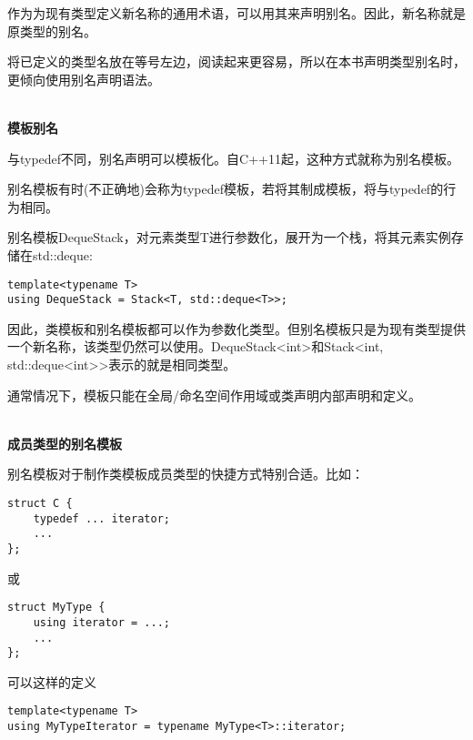 作为为现有类型定义新名称的通用术语，可以用其来声明别名。因此，新名称就是原类型的别名。

将已定义的类型名放在等号左边，阅读起来更容易，所以在本书声明类型别名时，更倾向使用别名声明语法。

\hspace*{\fill} \\ %
\noindent
\textbf{模板别名}

与typedef不同，别名声明可以模板化。自C++11起，这种方式就称为别名模板。

\begin{tcolorbox}[colback=webgreen!5!white,colframe=webgreen!75!black]
\hspace*{0.75cm}别名模板有时(不正确地)会称为typedef模板，若将其制成模板，将与typedef的行为相同。
\end{tcolorbox}

别名模板DequeStack，对元素类型T进行参数化，展开为一个栈，将其元素实例存储在std::deque:

\begin{lstlisting}[style=styleCXX]
template<typename T>
using DequeStack = Stack<T, std::deque<T>>;
\end{lstlisting}

因此，类模板和别名模板都可以作为参数化类型。但别名模板只是为现有类型提供一个新名称，该类型仍然可以使用。DequeStack<int>和Stack<int, std::deque<int>>表示的就是相同类型。

通常情况下，模板只能在全局/命名空间作用域或类声明内部声明和定义。

\hspace*{\fill} \\ %
\noindent
\textbf{成员类型的别名模板}

别名模板对于制作类模板成员类型的快捷方式特别合适。比如：

\begin{lstlisting}[style=styleCXX]
struct C {
	typedef ... iterator;
	...
};
\end{lstlisting}

或

\begin{lstlisting}[style=styleCXX]
struct MyType {
	using iterator = ...;
	...
};
\end{lstlisting}

可以这样的定义

\begin{lstlisting}[style=styleCXX]
template<typename T>
using MyTypeIterator = typename MyType<T>::iterator;
\end{lstlisting}

